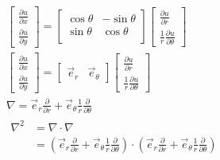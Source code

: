 \begin{frame}
	\frametitle{}
	\[ 
\begin{aligned}
	 &\begin{bmatrix}
		\frac{\partial u}{\partial x} \\
		\frac{\partial u}{\partial y} 
	 \end{bmatrix}
	 =
	 \begin{bmatrix}
		 \cos \theta &  -\sin \theta \\
		 \sin \theta& \cos \theta \\  
	 \end{bmatrix}
	 \begin{bmatrix}
		 \frac{\partial u}{\partial r} \\
		\frac{1}{r} \frac{\partial u}{\partial \theta} 
	  \end{bmatrix}\\
	&\begin{bmatrix}
		\frac{\partial u}{\partial x} \\
		\frac{\partial u}{\partial y} 
	 \end{bmatrix}
	 =
	 \begin{bmatrix}
		 \vec{e}_r & \vec{e}_\theta 
	 \end{bmatrix}
	 \begin{bmatrix}
		 \frac{\partial u}{\partial r} \\
		\frac{1}{r} \frac{\partial u}{\partial \theta} 
	  \end{bmatrix} \\
	&\nabla= \vec{e}_r \frac{\partial }{\partial r} +   \vec{e}_\theta \frac{1}{r} \frac{\partial }{\partial \theta} \\
	&\begin{aligned}
		\nabla ^2 &=\nabla \cdot \nabla \\
		&= (\vec{e}_r \frac{\partial }{\partial r} +   \vec{e}_\theta  \frac{1}{r}\frac{\partial }{\partial \theta})\cdot (\vec{e}_r \frac{\partial }{\partial r} +   \vec{e}_\theta \frac{1}{r} \frac{\partial }{\partial \theta})\\
	\end{aligned}	
\end{aligned}	
	\] 
\end{frame}

